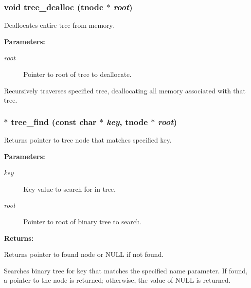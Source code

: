 \subsubsection{\setlength{\rightskip}{0pt plus 5cm}void tree\_\-dealloc ({\bf tnode} $\ast$ {\em root})}\label{tree_8h_a3}


Deallocates entire tree from memory.

\begin{Desc}
\item[{\bf Parameters: }]\par
\begin{description}
\item[
{\em root}]Pointer to root of tree to deallocate.

\end{description}
\end{Desc}
Recursively traverses specified tree, deallocating all memory associated with that tree. 
\subsubsection{$\ast$ tree\_\-find (const char $\ast$ {\em key}, {\bf tnode} $\ast$ {\em root})}\label{tree_8h_a1}


Returns pointer to tree node that matches specified key.

\begin{Desc}
\item[{\bf Parameters: }]\par
\begin{description}
\item[
{\em key}]Key value to search for in tree. \item[
{\em root}]Pointer to root of binary tree to search.

\end{description}
\end{Desc}
\begin{Desc}
\item[{\bf Returns: }]\par
Returns pointer to found node or NULL if not found.

\end{Desc}
Searches binary tree for key that matches the specified name parameter. If found, a pointer to the node is returned; otherwise, the value of NULL is returned. 
